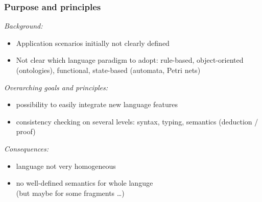 \documentclass{beamer}
\begin{document}
\begin{frame}[fragile]\frametitle{Purpose and principles}

  \emph{Background:}
  \begin{itemize}
  \item Application scenarios initially not clearly defined
  \item Not clear which language paradigm to adopt: rule-based,
    object-oriented (ontologies), functional, state-based (automata, Petri nets)
  \end{itemize}

  \emph{Overarching goals and principles:}
  \begin{itemize}
  \item possibility to easily integrate new language features
  \item consistency checking on several levels: syntax, typing, semantics
    (deduction / proof)
  \end{itemize}

  \emph{Consequences:}
  \begin{itemize}
  \item language not very homogeneous
  \item no well-defined semantics for whole languge\\ (but maybe for some fragments \dots)
  \end{itemize}

\end{frame}
\end{document}
